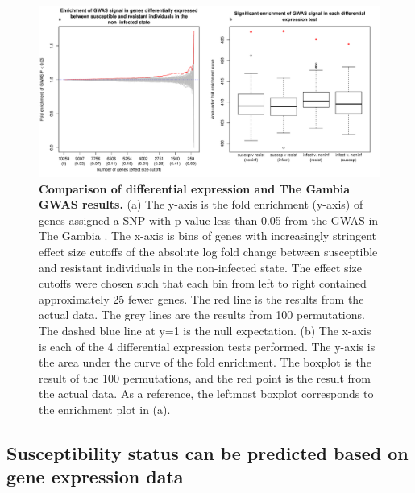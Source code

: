 \begin{figure}[ht]
\centering
\includegraphics[width=5in]{img/ch03/gwas.pdf}
\caption[Comparison of differential expression and The Gambia GWAS results.]{
\textbf{Comparison of differential expression and The Gambia GWAS results.} (a)
The y-axis is the fold enrichment (y-axis) of genes assigned a SNP
with p-value less than 0.05 from the GWAS in The Gambia
\citep{Thye2010}. The x-axis is bins of genes with increasingly
stringent effect size cutoffs of the absolute log fold change between
susceptible and resistant individuals in the non-infected state. The
effect size cutoffs were chosen such that each bin from left to right
contained approximately 25 fewer genes. The red line is the results
from the actual data. The grey lines are the results from 100
permutations. The dashed blue line at y=1 is the null expectation. (b)
The x-axis is each of the 4 differential expression tests performed.
The y-axis is the area under the curve of the fold enrichment. The
boxplot is the result of the 100 permutations, and the red point is
the result from the actual data. As a reference, the leftmost boxplot
corresponds to the enrichment plot in (a).
}
\label{fig:gwas}
\end{figure}

\subsection{Susceptibility status can be predicted based on gene expression data}

